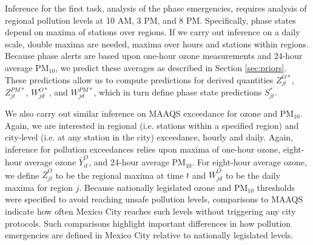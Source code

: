 \documentclass[alpha-refs]{wiley-article}
\begin{document}
Inference for the first task, analysis of the phase emergencies, requires analysis of regional pollution levels at 10 AM, 3 PM, and 8 PM. Specifically, phase states depend on maxima of stations over regions. If we carry out inference on a daily scale, double maxima are needed, maxima over hours and stations within regions. Because phase alerts are based upon one-hour ozone measurements and 24-hour average $\text{PM}_{10}$,
we predict these averages as described in Section \ref{sec:priors}. These predictions allow us to compute predictions for derived quantities ${Z_{jt}^{O*}}$, $ {Z_{jt}^{PM*}}$, ${W_{jd}^{O*}}$, and $ {W_{jd}^{PM*}}$, which in turn define phase state predictions ${S_{jt}^*}$. 


We also carry out similar inference on MAAQS exceedance for ozone and $\text{PM}_{10}$. Again, we are interested in regional (i.e. stations within a specified region) and city-level (i.e. at any station in the city) exceedance, hourly and daily. Again, inference for pollution exceedances relies upon maxima of one-hour ozone, eight-hour average ozone $\overline{Y}_{it}^{O}$, and 24-hour average $\text{PM}_{10}$. For eight-hour average ozone, we define $\overline{Z}_{jt}^{O}$ to be the regional maxima at time $t$ and $\overline{W}_{jd}^{O}$ to be the daily maxima for region $j$.
Because nationally legislated ozone and $\text{PM}_{10}$ thresholds were specified to avoid reaching unsafe pollution levels, comparisons to MAAQS indicate how often Mexico City reaches such levels without triggering any city protocols. Such comparisons highlight important differences in how pollution emergencies are defined in Mexico City relative to nationally legislated levels.
\end{document}
